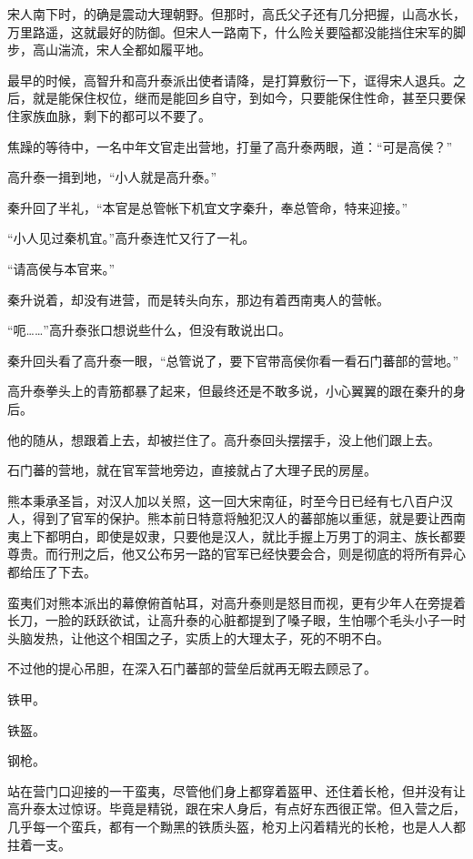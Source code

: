 宋人南下时，的确是震动大理朝野。但那时，高氏父子还有几分把握，山高水长，万里路遥，这就最好的防御。但宋人一路南下，什么险关要隘都没能挡住宋军的脚步，高山湍流，宋人全都如履平地。

最早的时候，高智升和高升泰派出使者请降，是打算敷衍一下，诓得宋人退兵。之后，就是能保住权位，继而是能回乡自守，到如今，只要能保住性命，甚至只要保住家族血脉，剩下的都可以不要了。

焦躁的等待中，一名中年文官走出营地，打量了高升泰两眼，道：“可是高侯？”

高升泰一揖到地，“小人就是高升泰。”

秦升回了半礼，“本官是总管帐下机宜文字秦升，奉总管命，特来迎接。”

“小人见过秦机宜。”高升泰连忙又行了一礼。

“请高侯与本官来。”

秦升说着，却没有进营，而是转头向东，那边有着西南夷人的营帐。

“呃……”高升泰张口想说些什么，但没有敢说出口。

秦升回头看了高升泰一眼，“总管说了，要下官带高侯你看一看石门蕃部的营地。”

高升泰拳头上的青筋都暴了起来，但最终还是不敢多说，小心翼翼的跟在秦升的身后。

他的随从，想跟着上去，却被拦住了。高升泰回头摆摆手，没上他们跟上去。

石门蕃的营地，就在官军营地旁边，直接就占了大理子民的房屋。

熊本秉承圣旨，对汉人加以关照，这一回大宋南征，时至今日已经有七八百户汉人，得到了官军的保护。熊本前日特意将触犯汉人的蕃部施以重惩，就是要让西南夷上下都明白，即使是奴隶，只要他是汉人，就比手握上万男丁的洞主、族长都要尊贵。而行刑之后，他又公布另一路的官军已经快要会合，则是彻底的将所有异心都给压了下去。

蛮夷们对熊本派出的幕僚俯首帖耳，对高升泰则是怒目而视，更有少年人在旁提着长刀，一脸的跃跃欲试，让高升泰的心脏都提到了嗓子眼，生怕哪个毛头小子一时头脑发热，让他这个相国之子，实质上的大理太子，死的不明不白。

不过他的提心吊胆，在深入石门蕃部的营垒后就再无暇去顾忌了。

铁甲。

铁盔。

钢枪。

站在营门口迎接的一干蛮夷，尽管他们身上都穿着盔甲、还住着长枪，但并没有让高升泰太过惊讶。毕竟是精锐，跟在宋人身后，有点好东西很正常。但入营之后，几乎每一个蛮兵，都有一个黝黑的铁质头盔，枪刃上闪着精光的长枪，也是人人都拄着一支。

